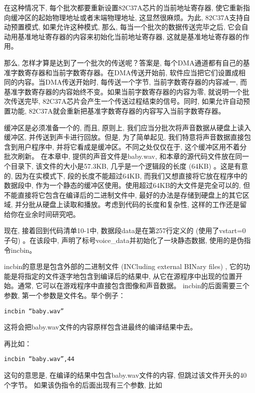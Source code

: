 \documentclass[12pt]{article}
\begin{document}
\begin{CJK}{UTF8}{gbsn}
在这种情况下, 每个批次都要重新设置82C37A芯片的当前地址寄存器, 使它重新指向缓冲区的起始物理地址或者末端物理地址, 这显然很麻烦。为此, 82C37A支持自动预置模式, 如果允许这种模式, 那么, 每当一个批次的数据传送完毕之后, 它会自动用基准地址寄存器的内容来初始化当前地址寄存器, 这就是基准地址寄存器的作用。

那么, 怎样才算是达到了一个批次的传送呢？答案是, 每个DMA通道都有自己的基准字数寄存器和当前字数寄存器。在DMA传送开始前, 软件应当把它们设置成相同的内容。当DMA传送开始时, 每传送一个字节, 当前字数寄存器的内容减一, 而基准字数寄存器的内容始终不变。如果当前字数寄存器的内容为零, 就说明一个批次传送完毕, 82C37A芯片会产生一个传送过程结束的信号。同时, 如果允许自动预置功能, 82C37A就会重新把基准字数寄存器的内容写入当前字数寄存器。

缓冲区是必须准备一个的, 而且, 原则上, 我们应当分批次将声音数据从硬盘上读入缓冲区, 并传送到声卡进行回放。但是, 为了简单起见, 我们特意将声音数据直接包含到用户程序中, 并将它看成是缓冲区。不同之处仅仅在于, 这个缓冲区用不着分批次刷新。
在本章中, 提供的声音文件是baby.wav, 和本章的源代码文件放在同一个目录下, 该文件的大小是57.3KB, 几乎是一个逻辑段的长度 (64KB) 。这是有意的, 因为在实模式下, 段的长度不能超过64KB, 而我们又想直接将它放在程序中的数据段中, 作为一个静态的缓冲区使用。使用超过64KB的大文件是完全可以的, 但不能直接将它包含在编译后的二进制文件中, 最好的办法是存储到硬盘上的其它区域, 并分批从硬盘上读取和播放。考虑到代码的长度和复杂性, 这样的工作还是留给你在业余时间研究吧。

现在, 接着回到代码清单10-1中, 数据段data是在第257行定义的 (使用了vstart=0子句) 。在该段中, 声明了标号voice\_{}data并初始化了一块静态数据, 使用的是伪指令incbin。

incbin的意思是包含外部的二进制文件 (INCluding external BINary files) , 它的功能是将指定的文件逐字地包含到编译后的结果中, 从它在源程序中出现的位置开始。通常, 它可以在游戏程序中直接包含图像和声音数据。
incbin的后面需要三个参数, 第一个参数是文件名。举个例子：

\begin{verbatim}
incbin “baby.wav”
\end{verbatim}

这将会把baby.wav文件的内容原样包含进最终的编译结果中去。

再比如：

\begin{verbatim}
incbin “baby.wav”,44
\end{verbatim}

这句的意思是, 在编译的结果中包含baby.wav文件的内容, 但跳过该文件开头的40个字节。
如果该伪指令的后面出现有三个参数, 比如


\end{CJK}
\end{document}
